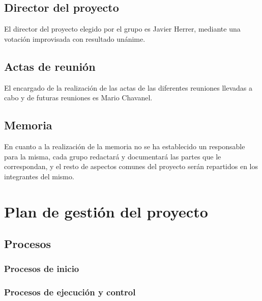 \documentclass{article}
\begin{document}
\subsection{Director del proyecto}
El director del proyecto elegido por el grupo es Javier Herrer, mediante una votación improvisada con resultado unánime.

\subsection{Actas de reunión}
El encargado de la realización de las actas de las diferentes reuniones llevadas a cabo y de futuras reuniones es Mario Chavanel.

\subsection{Memoria}
En cuanto a la realización de la memoria no se ha establecido un responsable para la misma, cada grupo redactará y documentará las partes que le correspondan, y el resto de aspectos comunes del proyecto serán repartidos en los integrantes del mismo.

\section{Plan de gestión del proyecto}
\subsection{Procesos}
\subsubsection{Procesos de inicio}


\subsubsection{Procesos de ejecución y control}
\end{document}
